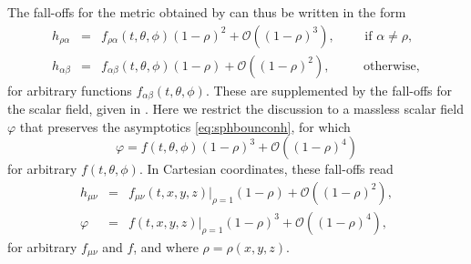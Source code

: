 \documentclass[a4paper,11pt]{article}
\numberwithin{equation}{section}
\begin{document}
The fall-offs for the metric obtained by \cite{Henneaux:1985tv} can thus be written in the form
\begin{eqnarray}
\label{eq:sphbounconh}
h_{\rho\alpha}&=&f_{\rho\alpha}(t,\theta,\phi)(1-\rho)^2+\mathcal{O}((1-\rho)^3), \qquad \textrm{ if $\alpha\neq\rho$}, \\ \nonumber
h_{\alpha\beta}&=&f_{\alpha\beta}(t,\theta,\phi)(1-\rho)+\mathcal{O}((1-\rho)^{2}), \qquad\; \textrm{ otherwise},
\end{eqnarray}
for arbitrary functions $f_{\alpha\beta}(t,\theta,\phi)$. 
These are supplemented by the fall-offs for the scalar field, given in \cite{Henneaux:2006hk}.
Here we restrict the discussion to a massless scalar field $\varphi$ that preserves the asymptotics \eqref{eq:sphbounconh}, for which
\begin{equation}\label{eq:sphbounconphi}
\varphi=f(t,\theta,\phi)(1-\rho)^3+\mathcal{O}((1-\rho)^4)
\end{equation}
for arbitrary $f(t,\theta,\phi)$. In Cartesian coordinates, these fall-offs read
\begin{eqnarray}
\label{eq:carbouncondh}
h_{\mu\nu}&=&f_{\mu\nu}(t,x,y,z)|_{\rho=1}(1-\rho)+\mathcal{O}((1-\rho)^{2}), \\
\label{eq:carbouncondphi}
\varphi&=&f(t,x,y,z)|_{\rho=1}(1-\rho)^3+\mathcal{O}((1-\rho)^{4}), 
\end{eqnarray}
for arbitrary $f_{\mu\nu}$ and $f$, and where $\rho = \rho(x,y,z)$.
\end{document}
